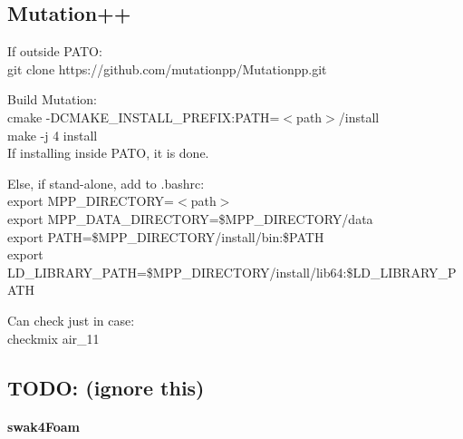 \documentclass[a4paper, 12pt]{article}
\numberwithin{equation}{section}
\begin{document}


    \subsection{Mutation++ \\}
    \label{sec:mutation}

        If outside PATO: \\
        git clone https://github.com/mutationpp/Mutationpp.git

        Build Mutation: \\
        cmake -DCMAKE\_INSTALL\_PREFIX:PATH=$<$path$>$/install \\
        make -j 4 install \\

        If installing inside PATO, it is done.

        Else, if stand-alone, add to .bashrc: \\
        export MPP\_DIRECTORY=$<$path$>$ \\
        export MPP\_DATA\_DIRECTORY=\$MPP\_DIRECTORY/data \\
        export PATH=\$MPP\_DIRECTORY/install/bin:\$PATH \\
        export LD\_LIBRARY\_PATH=\$MPP\_DIRECTORY/install/lib64:\$LD\_LIBRARY\_PATH

        Can check just in case: \\
        checkmix air\_11

    \subsection{TODO: (ignore this)}
    \paragraph{swak4Foam \\}
\end{document}
